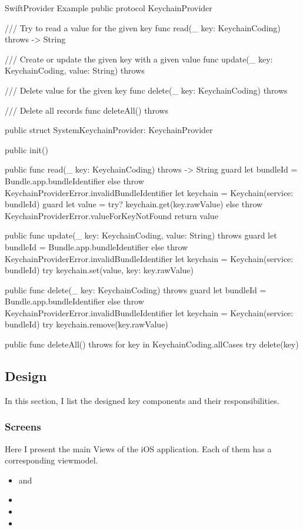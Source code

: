 \documentclass[
  biblatex = false,
  language=english,
  figures=false,
  sourcecodes,
  glossaries,
  index
]{kidiplom}
\begin{document}
\FloatBarrier
\begin{kicode}{Swift}{}{Provider Example}
public protocol KeychainProvider {
    
    /// Try to read a value for the given key
    func read(_ key: KeychainCoding) throws -> String

    /// Create or update the given key with a given value
    func update(_ key: KeychainCoding, value: String) throws

    /// Delete value for the given key
    func delete(_ key: KeychainCoding) throws

    /// Delete all records
    func deleteAll() throws
}

public struct SystemKeychainProvider: KeychainProvider {
    public init() {}
    
    public func read(_ key: KeychainCoding) throws -> String {
        guard let bundleId = Bundle.app.bundleIdentifier else { throw KeychainProviderError.invalidBundleIdentifier }
        let keychain = Keychain(service: bundleId)
        guard let value = try? keychain.get(key.rawValue) else { throw KeychainProviderError.valueForKeyNotFound }
        return value
    }
    
    public func update(_ key: KeychainCoding, value: String) throws {
        guard let bundleId = Bundle.app.bundleIdentifier else { throw KeychainProviderError.invalidBundleIdentifier }
        let keychain = Keychain(service: bundleId)
        try keychain.set(value, key: key.rawValue)
    }
    
    public func delete(_ key: KeychainCoding) throws {
        guard let bundleId = Bundle.app.bundleIdentifier else { throw KeychainProviderError.invalidBundleIdentifier }
        let keychain = Keychain(service: bundleId)
        try keychain.remove(key.rawValue)
    }
    
    public func deleteAll() throws {
        for key in KeychainCoding.allCases {
            try delete(key)
        }
    }
}
\end{kicode}
\FloatBarrier

\subsection{Design}
In this section, I list the designed key components and their responsibilities.

\subsubsection{Screens}
Here I present the main Views of the iOS application. Each of them has a corresponding viewmodel.
\begin{itemize}
	\item {} and 
	\item {}
	\item {}
	\item {}
\end{itemize}
\end{document}
